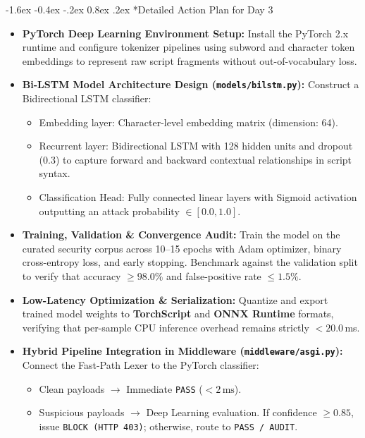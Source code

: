 \documentclass[11pt,a4paper]{article}
\makeatletter
\renewcommand{\section}{\@startsection{section}{1}{\z@}%
  {-1.6ex \@plus -0.4ex \@minus -.2ex}%
  {0.8ex \@plus .2ex}%
  {\normalfont\large\bfseries\color{primaryblue}}}
\makeatother
\begin{document}
\section*{Detailed Action Plan for Day 3}
\begin{itemize}[leftmargin=1.5em, itemsep=3pt]
    \item \textbf{PyTorch Deep Learning Environment Setup:}
    Install the PyTorch 2.x runtime and configure tokenizer pipelines using subword and character token embeddings to represent raw script fragments without out-of-vocabulary loss.
    
    \item \textbf{Bi-LSTM Model Architecture Design (\texttt{models/bilstm.py}):}
    Construct a Bidirectional LSTM classifier:
    \begin{itemize}[leftmargin=1.2em, itemsep=1pt]
        \item Embedding layer: Character-level embedding matrix (dimension: 64).
        \item Recurrent layer: Bidirectional LSTM with 128 hidden units and dropout (0.3) to capture forward and backward contextual relationships in script syntax.
        \item Classification Head: Fully connected linear layers with Sigmoid activation outputting an attack probability $\in [0.0, 1.0]$.
    \end{itemize}

    \item \textbf{Training, Validation \& Convergence Audit:}
    Train the model on the curated security corpus across 10--15 epochs with Adam optimizer, binary cross-entropy loss, and early stopping. Benchmark against the validation split to verify that accuracy $\ge 98.0\%$ and false-positive rate $\le 1.5\%$.

    \item \textbf{Low-Latency Optimization \& Serialization:}
    Quantize and export trained model weights to \textbf{TorchScript} and \textbf{ONNX Runtime} formats, verifying that per-sample CPU inference overhead remains strictly $< 20.0$\,ms.

    \item \textbf{Hybrid Pipeline Integration in Middleware (\texttt{middleware/asgi.py}):}
    Connect the Fast-Path Lexer to the PyTorch classifier:
    \begin{itemize}[leftmargin=1.2em, itemsep=1pt]
        \item Clean payloads $\rightarrow$ Immediate \texttt{PASS} ($< 2\,\text{ms}$).
        \item Suspicious payloads $\rightarrow$ Deep Learning evaluation. If confidence $\ge 0.85$, issue \texttt{BLOCK (HTTP 403)}; otherwise, route to \texttt{PASS / AUDIT}.
    \end{itemize}
\end{itemize}
\end{document}
